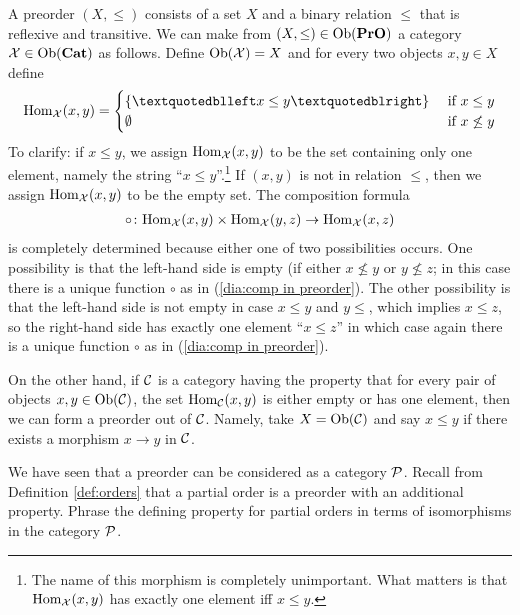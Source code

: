 
\subsubsection{}\label{sec:preorder as cat}

A preorder $(X,\leq)$ consists of a set $X$ and a binary relation $\leq$ that is reflexive and transitive. We can make from $(X,\leq)\in\textnormal{Ob}({\bf PrO})$ a category $\mathcal{X}\in\textnormal{Ob}({\bf Cat})$ as follows. Define $\textnormal{Ob}(\mathcal{X})=X$ and for every two objects $x,y\in X$ define 
$$\Hom_\mcX(x,y)=\begin{cases}\{“x\leq y”\}&\tn{ if } x\leq y\\\emptyset&\tn{ if } x\not\leq y\end{cases}$$
To clarify: if $x\leq y$, we assign $\textnormal{Hom}_\mathcal{X}(x,y)$ to be the set containing only one element, namely the string “$x\leq y$”.\footnote{The name of this morphism is completely unimportant. What matters is that $\textnormal{Hom}_\mathcal{X}(x,y)$ has exactly one element iff $x\leq y$.} If $(x,y)$ is not in relation $\leq$, then we assign $\textnormal{Hom}_\mathcal{X}(x,y)$ to be the empty set. The composition formula 
\begin{align}\label{dia:comp in preorder}
\circ\colon\textnormal{Hom}_\mathcal{X}(x,y)\times\textnormal{Hom}_\mathcal{X}(y,z)\rightarrow\textnormal{Hom}_\mathcal{X}(x,z)
\end{align}
is completely determined because either one of two possibilities occurs. One possibility is that the left-hand side is empty (if either $x\not\leq y$ or $y\not\leq z$; in this case there is a unique function $\circ$ as in (\ref{dia:comp in preorder}). The other possibility is that the left-hand side is not empty in case $x\leq y$ and $y\leq$, which implies $x\leq z$, so the right-hand side has exactly one element $“x\leq z”$ in which case again there is a unique function $\circ$ as in (\ref{dia:comp in preorder}).

On the other hand, if $\mathcal{C}$ is a category having the property that for every pair of objects $x,y\in\textnormal{Ob}(\mathcal{C})$, the set $\textnormal{Hom}_\mathcal{C}(x,y)$ is either empty or has one element, then we can form a preorder out of $\mathcal{C}$. Namely, take $X=\textnormal{Ob}(\mathcal{C})$ and say $x\leq y$ if there exists a morphism $x\to y$ in $\mathcal{C}$. 

\begin{exercise}
We have seen that a preorder can be considered as a category $\mathcal{P}$. Recall from Definition \ref{def:orders} that a partial order is a preorder with an additional property. Phrase the defining property for partial orders in terms of isomorphisms in the category $\mathcal{P}$.
\end{exercise}


